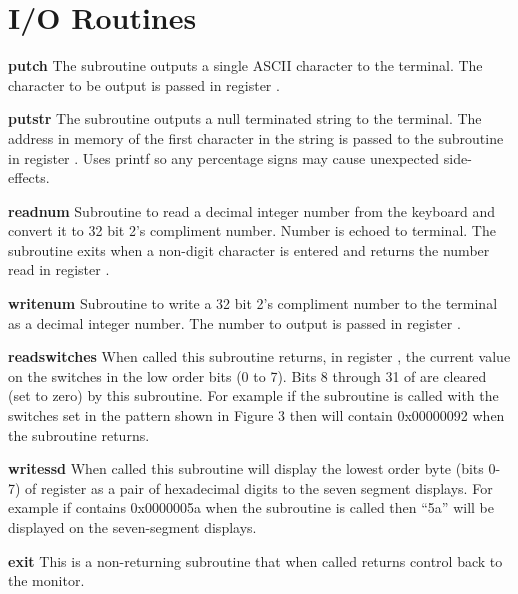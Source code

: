 \documentclass[a4paper,10pt]{article}
\begin{document}
\newpage
\appendix
\section{I/O Routines}
\label{app:ioroutines}

\begin{description}
\item \textbf{putch} 
The subroutine outputs a single ASCII character to the
terminal. The character to be output is passed in register .

\item \textbf{putstr} 
The subroutine outputs a null terminated string to the
terminal. The address in memory of the first character in the string
is passed to the subroutine in register . Uses printf so any
percentage signs may cause unexpected side-effects.

\item \textbf{readnum} 
Subroutine to read a decimal integer number from the keyboard
and convert it to 32 bit 2's compliment number. Number is echoed to
terminal. The subroutine exits when a non-digit character is entered
and returns the number read in register .

\item \textbf{writenum} 
Subroutine to write a 32 bit 2's compliment number to the
terminal as a decimal integer number. The number to output is passed
in register .

\item \textbf{readswitches} 
When called this subroutine returns, in register
, the current value on the switches in the low order bits (0 to
7). Bits 8 through 31 of  are cleared (set to zero) by this
subroutine. For example if the subroutine is called with the switches
set in the pattern shown in Figure 3 then  will contain 0x00000092
when the subroutine returns.

\item \textbf{writessd}
When called this subroutine will display the lowest
order byte (bits 0-7) of register  as a pair of hexadecimal digits
to the seven segment displays. For example if  contains 0x0000005a
when the subroutine is called then ``5a'' will be displayed on the
seven-segment displays.

\item \textbf{exit}
This is a non-returning subroutine that when called returns
control back to the monitor.
\end{description}



\thispagestyle{rcsfooters}
\pagestyle{rcsfooters}
\end{document}
